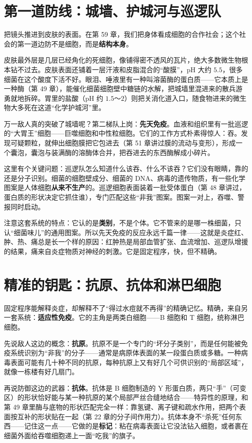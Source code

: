 \section{第一道防线：城墙、护城河与巡逻队}

把镜头推进到皮肤的表面。在第 59 章，我们把身体看成细胞的合作社会；这个社会的第一道边防不是细胞，而是\textbf{结构本身}。

皮肤最外层是几层已经角化的死细胞，像铺得密不透风的瓦片，绝大多数微生物根本钻不过去。皮肤表面还铺着一层汗液和皮脂混合的“酸膜”，pH 大约 $5.5$，很多细菌在这个酸度下活不好。眼泪、唾液里有一种叫溶菌酶的蛋白质——它本质上是一种酶（第 49 章），能催化细菌细胞壁中糖链的水解，把城墙里混进来的散兵游勇就地拆碎。胃里的盐酸（pH 约 $1.5$～$2$）则把关消化道入口，随食物进来的微生物大多死在这道“化学护城河”里。

万一敌人真的突破了城墙呢？第二梯队上岗：\textbf{先天免疫}。血液和组织里有一批巡逻的“大胃王”细胞——巨噬细胞和中性粒细胞。它们的工作方式朴素得惊人：吞。发现可疑颗粒，就伸出细胞膜把它包进去（第 51 章讲过膜的流动与变形），形成一个囊泡，囊泡与装满酶的溶酶体合并，把吞进去的东西酶解成小碎片。

这里有个关键问题：巡逻队怎么知道什么该吞、什么不该吞？它们没有眼睛，靠的还是分子识别。细菌的细胞壁成分、细菌的 DNA、病毒的遗传物质，有一些化学图案是人体细胞\textbf{从来不生产}的。巡逻细胞表面装着一批受体蛋白（第 48 章讲过，蛋白质的形状决定它抓住谁），专门匹配这些“非我”图案。图案一对上，吞噬、警报同时启动。

注意这套系统的特点：它认的是\textbf{类别}，不是个体。它不管来的是哪一株细菌，只认“细菌味儿”的通用图案。所以先天免疫的反应永远千篇一律——这就是炎症红、肿、热、痛总是长一个样的原因：红肿热是局部血管扩张、血流增加、巡逻队增援的结果，痛来自炎症物质对神经的刺激。它是固定程序，快，但不精确。

\section{精准的钥匙：抗原、抗体和淋巴细胞}

固定程序能解释炎症，却解释不了“得过水痘就不再得”的精确记忆。精确，来自另一套系统：\textbf{适应性免疫}。它的主角是两类白细胞——B 细胞和 T 细胞，统称淋巴细胞。

先说敌人这边的概念：\textbf{抗原}。抗原不是一个专门的“坏分子类别”，而是任何能被免疫系统识别为“非我”的分子——通常是病原体表面的某一段蛋白质或多糖。一种病毒表面可能有几十种不同的抗原，每种抗原上又有好几个可供识别的“局部区域”，就像一栋楼有好几扇门。

再说防御这边的武器：\textbf{抗体}。抗体是 B 细胞制造的 Y 形蛋白质，两只“手”（可变区）的形状恰好能与某一种抗原的某个局部严丝合缝地结合——特异性的原理，和第 49 章里酶与底物的形状匹配完全一样：靠氢键、离子键和疏水作用，把两个表面按互补的形状贴在一起（第 22 章的分子间作用力）。抗体本身不“杀死”任何东西——记住这一点——它做的是\textbf{标记}：粘在病毒表面让它没法钻入细胞，或者裹在细菌外面给吞噬细胞递上一面“吃我”的旗子。


